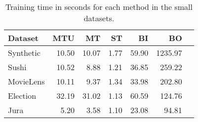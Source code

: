 \begin{table*}
\centering
\caption{Training time in seconds for each method in the small datasets.}
\begin{tabular}{lrrrrrr}
\hline
\textbf{Dataset} &\textbf{MTU}&\textbf{MT}&\textbf{ST}&\textbf{BI}&\textbf{BO}\\
\hline
Synthetic&10.50&10.07&1.77&59.90&1235.97\\
Sushi&10.52&8.88&1.21&36.85&259.22\\
MovieLens&10.11&9.37&1.34&33.98&202.80\\
Election&32.19&31.02&1.13&60.59&124.76\\
Jura&5.20&3.58&1.10&23.08&94.81\\
\hline
\end{tabular}
\label{tab:time}
\end{table*}
